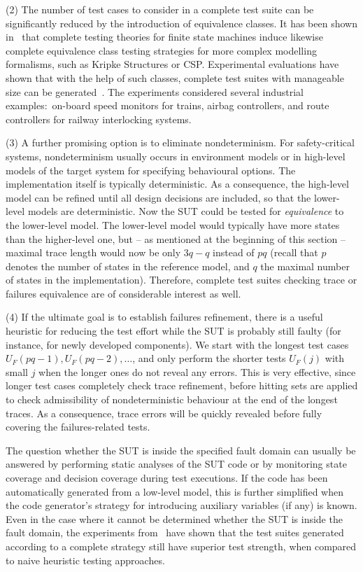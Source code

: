 \documentclass[3p,times]{elsarticle}
\begin{document}
\medskip
\noindent (2) The number of test cases to consider in a complete test suite
can be significantly reduced by the introduction of equivalence classes. It
has been shown in~\cite{Huang2017} that complete testing theories for finite
state machines induce likewise complete equivalence class testing strategies
for more complex modelling formalisms, such as Kripke Structures or CSP.
Experimental evaluations have shown that with the help of such classes,
complete test suites with manageable size can be
generated~\cite{DBLP:conf/rssrail/PeleskaHH16,Huebner2017}. The experiments
considered several industrial examples:~on-board speed monitors for trains,
airbag controllers, and route controllers for railway interlocking systems.

\medskip
\noindent (3) A further promising option is to eliminate nondeterminism. For
safety-critical systems, nondeterminism usually occurs in environment models
or in high-level models of the target system for specifying behavioural
options. The implementation itself is typically deterministic. As a
consequence, the high-level model can be refined until all design decisions
are included, so that the lower-level models are deterministic. Now the SUT
could be tested for \emph{equivalence} to the lower-level model. The
lower-level model would typically have more states than the higher-level one,
but -- as mentioned at the beginning of this section -- maximal trace length
would now be only $3q-q$ instead of $pq$ (recall that $p$ denotes the number
of states in the reference model, and $q$ the maximal number of states in the
implementation). Therefore, complete test suites checking trace or failures
equivalence are of considerable interest as well.

\medskip
\noindent (4) If the ultimate goal is to establish failures refinement, there
is a useful  heuristic for reducing the test effort while the SUT is probably
still faulty (for instance, for newly developed components). We start with
the longest test cases $U_F(pq-1), U_F(pq-2), \dots$, and only perform the
shorter tests $U_F(j)$ with small $j$ when the longer ones do not reveal any
errors. This is very effective, since longer test cases completely check
trace refinement, before hitting sets are applied to check admissibility of
nondeterministic behaviour at the end of the longest traces. As a
consequence, trace errors will be quickly revealed before fully covering the
failures-related tests.

The question whether the SUT is inside the specified fault domain can usually
be answered by performing static analyses of the SUT code or by monitoring
state coverage and decision coverage during test executions. If the code has
been automatically generated from a low-level model, this is further
simplified when the code generator's strategy for introducing auxiliary
variables (if any) is known. Even in the case where it cannot be determined
whether the SUT is inside the fault domain, the experiments
from~\cite{DBLP:conf/rssrail/PeleskaHH16,Huebner2017} have shown that the
test suites generated according to a complete strategy still have superior
test strength, when compared to naive heuristic testing approaches.
\end{document}
